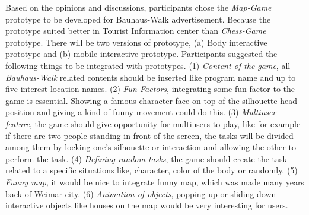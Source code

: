 Based on the opinions and discussions, participants chose the \emph{Map-Game} prototype to be developed for Bauhaus-Walk advertisement. Because the prototype suited better in Tourist Information center than \emph{Chess-Game} prototype. There will be two versions of prototype, (a) Body interactive prototype and (b) mobile interactive prototype. Participants suggested the following things to be integrated with prototypes. (1) \emph{Content of the game}, all \emph{Bauhaus-Walk} related contents should be inserted like program name and up to five interest location names. (2) \emph{Fun Factors}, integrating some fun factor to the game is essential. Showing a famous character face on top of the silhouette head position and giving a kind of funny movement could do this. (3) \emph{Multiuser feature}, the game should give opportunity for multiusers to play, like for example if there are two people standing in front of the screen, the tasks will be divided among them by locking one's silhouette or interaction and allowing the other to perform the task. (4) \emph{Defining random tasks}, the game should create the task related to a specific situations like, character, color of the body or randomly. (5) \emph{Funny map}, it would be nice to integrate funny map, which was made many years back of Weimar city. (6) \emph{Animation of objects}, popping up or sliding down interactive objects like houses on the map would be very interesting for users.





